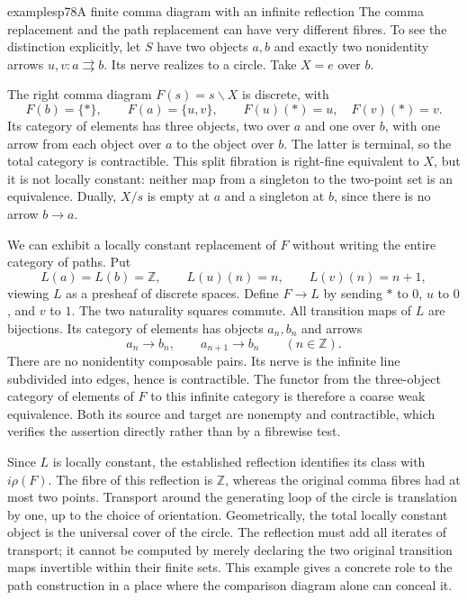 \begin{dcomment}{examples}{p78}{A finite comma diagram with an infinite reflection}
The comma replacement and the path replacement can have very different fibres. To see the distinction explicitly, let $S$ have two objects $a,b$ and exactly two nonidentity arrows $u,v:a\rightrightarrows b$. Its nerve realizes to a circle. Take $X=e$ over $b$.

The right comma diagram $F(s)=s\backslash X$ is discrete, with
\[
 F(b)=\{*\},\qquad F(a)=\{u,v\},\qquad
 F(u)(*)=u,\quad F(v)(*)=v.
\]
Its category of elements has three objects, two over $a$ and one over $b$, with one arrow from each object over $a$ to the object over $b$. The latter is terminal, so the total category is contractible. This split fibration is right-fine equivalent to $X$, but it is not locally constant: neither map from a singleton to the two-point set is an equivalence. Dually, $X/s$ is empty at $a$ and a singleton at $b$, since there is no arrow $b\to a$.

We can exhibit a locally constant replacement of $F$ without writing the entire category of paths. Put
\[
 L(a)=L(b)=\mathbb Z,\qquad L(u)(n)=n,
 \qquad L(v)(n)=n+1,
\]
viewing $L$ as a presheaf of discrete spaces. Define $F\to L$ by sending $*$ to $0$, $u$ to $0$, and $v$ to $1$. The two naturality squares commute. All transition maps of $L$ are bijections. Its category of elements has objects $a_n,b_n$ and arrows
\[
 a_n\longrightarrow b_n,\qquad a_{n+1}\longrightarrow b_n
 \qquad(n\in\mathbb Z).
\]
There are no nonidentity composable pairs. Its nerve is the infinite line subdivided into edges, hence is contractible. The functor from the three-object category of elements of $F$ to this infinite category is therefore a coarse weak equivalence. Both its source and target are nonempty and contractible, which verifies the assertion directly rather than by a fibrewise test.

Since $L$ is locally constant, the established reflection identifies its class with $i\rho(F)$. The fibre of this reflection is $\mathbb Z$, whereas the original comma fibres had at most two points. Transport around the generating loop of the circle is translation by one, up to the choice of orientation. Geometrically, the total locally constant object is the universal cover of the circle. The reflection must add all iterates of transport; it cannot be computed by merely declaring the two original transition maps invertible within their finite sets. This example gives a concrete role to the path construction in a place where the comparison diagram alone can conceal it.
\end{dcomment}

